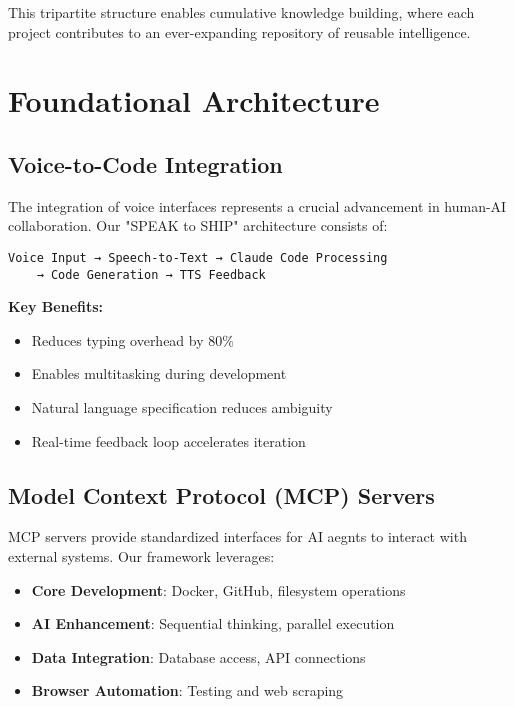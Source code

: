 \documentclass[11pt]{article}
\begin{document}
This tripartite structure enables cumulative knowledge building, where each project contributes to an ever-expanding repository of reusable intelligence.

\section{Foundational Architecture}

\subsection{Voice-to-Code Integration}

The integration of voice interfaces represents a crucial advancement in human-AI collaboration. Our "SPEAK to SHIP" architecture consists of:

\begin{verbatim}
Voice Input → Speech-to-Text → Claude Code Processing 
    → Code Generation → TTS Feedback
\end{verbatim}

\textbf{Key Benefits:}
\begin{itemize}[noitemsep]
\item Reduces typing overhead by 80\%
\item Enables multitasking during development
\item Natural language specification reduces ambiguity
\item Real-time feedback loop accelerates iteration
\end{itemize}

\subsection{Model Context Protocol (MCP) Servers}

MCP servers provide standardized interfaces for AI aegnts to interact with external systems. Our framework leverages:

\begin{itemize}[noitemsep]
\item \textbf{Core Development}: Docker, GitHub, filesystem operations
\item \textbf{AI Enhancement}: Sequential thinking, parallel execution
\item \textbf{Data Integration}: Database access, API connections
\item \textbf{Browser Automation}: Testing and web scraping
\end{itemize}
\end{document}

